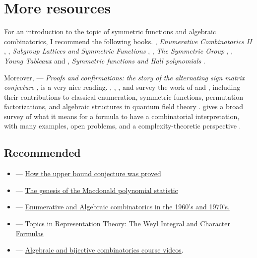 

\section[resources]{More resources}


For an introduction to the topic of symmetric functions and algebraic combinatorics,
I recommend the following books. 
, \emph{Enumerative Combinatorics II} \cite{StanleyEC2}, 
, \emph{Subgroup Lattices and Symmetric Functions} \cite{Butler1994}, 
, \emph{The Symmetric Group} \cite{Sagan2001}, 
, \emph{Young Tableaux} \cite{Fulton1997} and 
, \emph{Symmetric functions and Hall polynomials} \cite{Macdonald1995}.

Moreover,  --- \emph{Proofs and confirmations: the story of 
the alternating sign matrix conjecture} \cite{Bressoud1999}, is a very nice reading.
, , ,
and  survey the work of  and
, including their contributions to classical
enumeration, symmetric functions, permutation factorizations, and algebraic
structures in quantum field theory \cite{FoleyMoralesRattanYeats2022}.
 gives a broad survey of what it means for a formula to have a
combinatorial interpretation, with many examples, open problems, and a
complexity-theoretic perspective \cite{Pak2024}.


\subsection[miscLinks]{Recommended}

\begin{itemize}

\item {}  --- \href{http://www-math.mit.edu/~rstan/papers/ubc.pdf}{How the upper bound conjecture was proved}

\item {}  --- \href{https://www.emis.de/journals/SLC/wpapers/s54Ahaglund.pdf}{The genesis of the Macdonald polynomial statistic}

\item {}  --- \href{https://arxiv.org/pdf/2105.07884.pdf}{Enumerative and Algebraic combinatorics in the 1960's and 1970's.}

\item {}  --- \href{https://www.math.columbia.edu/~woit/notes12.pdf}{Topics in Representation Theory: The Weyl Integral and Character Formulas}

\item {}  --- \href{http://www.viennot.org/abjc-course.html}{Algebraic and bijective combinatorics course videos}.

\end{itemize}



